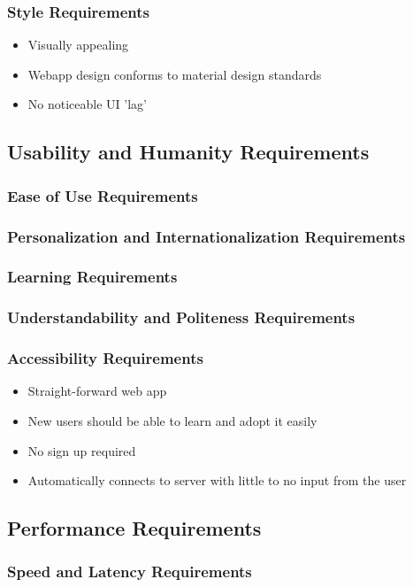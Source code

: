 \documentclass[12pt, titlepage]{article}
\begin{document}
\subsubsection{Style Requirements}
\begin{itemize}
\item Visually appealing
\item Webapp design conforms to material design standards
\item No noticeable UI 'lag'
\end{itemize}

\subsection{Usability and Humanity Requirements}
\subsubsection{Ease of Use Requirements}
\subsubsection{Personalization and Internationalization Requirements}
\subsubsection{Learning Requirements}
\subsubsection{Understandability and Politeness Requirements}
\subsubsection{Accessibility Requirements}
\begin{itemize}
\item Straight-forward web app
\item New users should be able to learn and adopt it easily
\item No sign up required
\item Automatically connects to server with little to no input from the user
\end{itemize}

\subsection{Performance Requirements}
\subsubsection{Speed and Latency Requirements}
\end{document}

